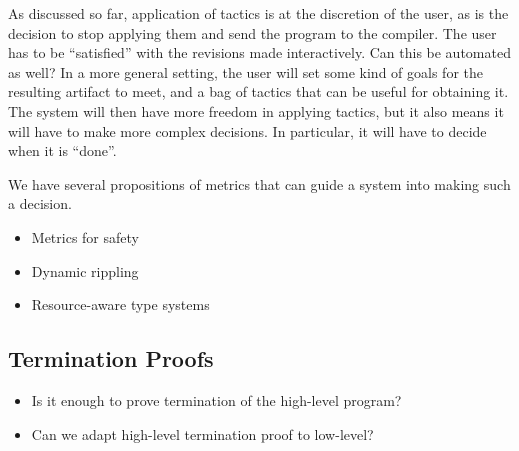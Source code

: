 As discussed so far, application of tactics is at the discretion of the
user, as is the decision to stop applying them and send the program to
the compiler.
The user has to be ``satisfied'' with the revisions made interactively.
Can this be automated as well?
In a more general setting, the user will set some kind of goals for the
resulting artifact to meet, and a bag of tactics that can be useful for
obtaining it.
The system will then have more freedom in applying tactics, but it also
means it will have to make more complex decisions.
In particular, it will have to decide when it is ``done''.

We have several propositions of metrics that can guide a system into
making such a decision.

\begin{itemize}
  \item Metrics for safety
  \item Dynamic rippling
  \item Resource-aware type systems
\end{itemize}

\subsection{Termination Proofs}

\begin{itemize}
  \item Is it enough to prove termination of the high-level program?
  \item Can we adapt high-level termination proof to low-level?
\end{itemize}
